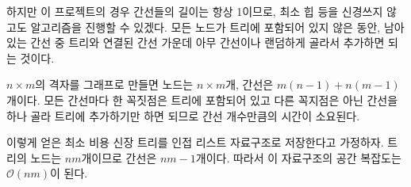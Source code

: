 하지만 이 프로젝트의 경우 간선들의 길이는 항상 1이므로, 최소 힙 등을 신경쓰지 않고도 알고리즘을 진행할 수 있겠다. 
모든 노드가 트리에 포함되어 있지 않은 동안, 남아 있는 간선 중 트리와 연결된 간선 가운데 아무 간선이나 랜덤하게 골라서 추가하면 되는 것이다.

$n\times m$의 격자를 그래프로 만들면 노드는 $n\times m$개, 간선은 $m\left(n - 1\right) + n\left(m - 1\right)$개이다.
모든 간선마다 한 꼭짓점은 트리에 포함되어 있고 다른 꼭지점은 아닌 간선을 하나 골라 트리에 추가하기만 하면 되므로 간선 개수만큼의 시간이 소요된다.

이렇게 얻은 최소 비용 신장 트리를 인접 리스트 자료구조로 저장한다고 가정하자. 트리의 노드는 $nm$개이므로 간선은 $nm - 1$개이다. 따라서 
이 자료구조의 공간 복잡도는 $\mathcal{O}\left(nm\right)$이 된다.



